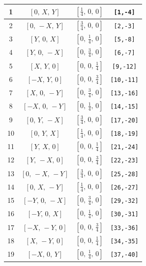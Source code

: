 \documentclass[fleqn,8pt]{jsarticle}
\begin{document}
\begin{longtable}{cccc}
1 & $\left[ 0,\, X,\, Y \right]$ & $\left[ \frac{1}{4},\, 0,\, 0 \right]$ & {\tt [1,-4]} \\ \hline
2 & $\left[ 0,\, - X,\, Y \right]$ & $\left[ \frac{3}{4},\, 0,\, 0 \right]$ & {\tt [2,-3]} \\ \hline
3 & $\left[ Y,\, 0,\, X \right]$ & $\left[ 0,\, \frac{1}{4},\, 0 \right]$ & {\tt [5,-8]} \\ \hline
4 & $\left[ Y,\, 0,\, - X \right]$ & $\left[ 0,\, \frac{3}{4},\, 0 \right]$ & {\tt [6,-7]} \\ \hline
5 & $\left[ X,\, Y,\, 0 \right]$ & $\left[ 0,\, 0,\, \frac{1}{4} \right]$ & {\tt [9,-12]} \\ \hline
6 & $\left[ - X,\, Y,\, 0 \right]$ & $\left[ 0,\, 0,\, \frac{3}{4} \right]$ & {\tt [10,-11]} \\ \hline
7 & $\left[ X,\, 0,\, - Y \right]$ & $\left[ 0,\, \frac{3}{4},\, 0 \right]$ & {\tt [13,-16]} \\ \hline
8 & $\left[ - X,\, 0,\, - Y \right]$ & $\left[ 0,\, \frac{1}{4},\, 0 \right]$ & {\tt [14,-15]} \\ \hline
9 & $\left[ 0,\, Y,\, - X \right]$ & $\left[ \frac{3}{4},\, 0,\, 0 \right]$ & {\tt [17,-20]} \\ \hline
10 & $\left[ 0,\, Y,\, X \right]$ & $\left[ \frac{1}{4},\, 0,\, 0 \right]$ & {\tt [18,-19]} \\ \hline
11 & $\left[ Y,\, X,\, 0 \right]$ & $\left[ 0,\, 0,\, \frac{1}{4} \right]$ & {\tt [21,-24]} \\ \hline
12 & $\left[ Y,\, - X,\, 0 \right]$ & $\left[ 0,\, 0,\, \frac{3}{4} \right]$ & {\tt [22,-23]} \\ \hline
13 & $\left[ 0,\, - X,\, - Y \right]$ & $\left[ \frac{3}{4},\, 0,\, 0 \right]$ & {\tt [25,-28]} \\ \hline
14 & $\left[ 0,\, X,\, - Y \right]$ & $\left[ \frac{1}{4},\, 0,\, 0 \right]$ & {\tt [26,-27]} \\ \hline
15 & $\left[ - Y,\, 0,\, - X \right]$ & $\left[ 0,\, \frac{3}{4},\, 0 \right]$ & {\tt [29,-32]} \\ \hline
16 & $\left[ - Y,\, 0,\, X \right]$ & $\left[ 0,\, \frac{1}{4},\, 0 \right]$ & {\tt [30,-31]} \\ \hline
17 & $\left[ - X,\, - Y,\, 0 \right]$ & $\left[ 0,\, 0,\, \frac{3}{4} \right]$ & {\tt [33,-36]} \\ \hline
18 & $\left[ X,\, - Y,\, 0 \right]$ & $\left[ 0,\, 0,\, \frac{1}{4} \right]$ & {\tt [34,-35]} \\ \hline
19 & $\left[ - X,\, 0,\, Y \right]$ & $\left[ 0,\, \frac{1}{4},\, 0 \right]$ & {\tt [37,-40]} \\ \hline

\end{longtable}
\end{document}
